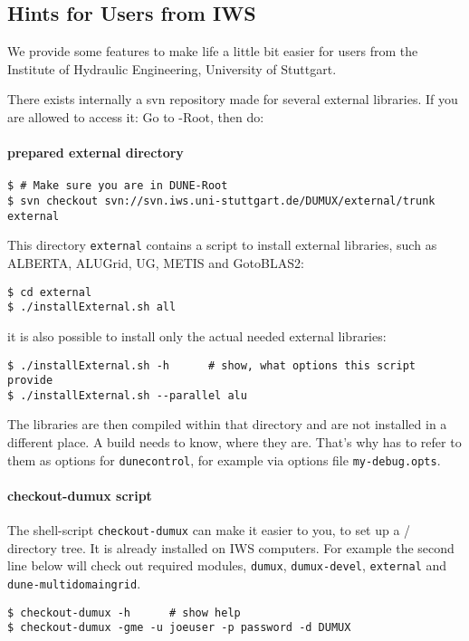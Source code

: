 \subsection{Hints for Users from IWS}
We provide some features to make life a little bit easier for
users from the Institute of Hydraulic Engineering, University of Stuttgart.

There exists internally a svn repository made for several external libraries.
If you are allowed to access it: Go to {\Dune}-Root, then do: 
\paragraph{prepared external directory}

\begin{lstlisting}[style=Bash]
$ # Make sure you are in DUNE-Root
$ svn checkout svn://svn.iws.uni-stuttgart.de/DUMUX/external/trunk external
\end{lstlisting}

This directory \texttt{external} contains a script to install external libraries, such as 
ALBERTA, ALUGrid, UG, METIS and GotoBLAS2: 

\begin{lstlisting}[style=Bash]
$ cd external
$ ./installExternal.sh all
\end{lstlisting}

it is also possible to install only the actual needed external libraries:

\begin{lstlisting}[style=Bash]
$ ./installExternal.sh -h      # show, what options this script provide
$ ./installExternal.sh --parallel alu
\end{lstlisting}

The libraries are then compiled within that directory and are not installed in a different place. 
A \Dune build needs to know, where they are. That's why has to refer to them as options for \texttt{dunecontrol}, for example via options file \texttt{my-debug.opts}.

\paragraph{checkout-dumux script}
The shell-script \texttt{checkout-dumux} can make it easier to you, to set up a {\Dune}/{\Dumux} directory tree.
It is already installed on IWS computers.
For example the second line below will check out required \Dune modules, \texttt{dumux}, \texttt{dumux-devel}, \texttt{external} and \texttt{dune-multidomaingrid}.

\begin{lstlisting}[style=Bash]
$ checkout-dumux -h      # show help
$ checkout-dumux -gme -u joeuser -p password -d DUMUX 
\end{lstlisting}

